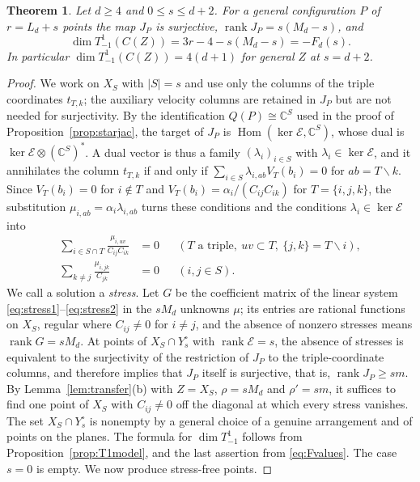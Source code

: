 \documentclass{amsart}
\newtheorem{theorem}{Theorem}[section]
\theoremstyle{definition}
\theoremstyle{remark}
\numberwithin{equation}{section}
\newcommand{\CC}{\mathbb{C}}
\DeclareMathOperator{\rank}{rank}
\DeclareMathOperator{\Hom}{Hom}
\begin{document}
\begin{theorem}\label{thm:outer}
Let $d\ge4$ and $0\le s\le d+2$. For a general configuration $P$ of $r=L_d+s$ points
the map $J_P$ is surjective, $\rank J_P=s(M_d-s)$, and
\[
  \dim T^1_{-1}(C(Z))=3r-4-s(M_d-s)=-F_d(s).
\]
In particular $\dim T^1_{-1}(C(Z))=4(d+1)$ for general $Z$ at $s=d+2$.
\end{theorem}

\begin{proof}
We work on $X_S$ with $|S|=s$ and use only the columns of the triple coordinates
$t_{T,k}$; the auxiliary velocity columns are retained in $J_P$ but are not needed
for surjectivity. By the identification $Q(P)\cong\CC^S$ used in the proof of
Proposition~\ref{prop:starjac}, the target of $J_P$ is $\Hom(\ker\mathcal E,\CC^S)$,
whose dual is $\ker\mathcal E\otimes(\CC^S)^*$. A dual vector is thus a family
$(\lambda_i)_{i\in S}$ with $\lambda_i\in\ker\mathcal E$, and it annihilates the column
$t_{T,k}$ if and only if $\sum_{i\in S}\lambda_{i,ab}V_T(b_i)=0$ for $ab=T\smallsetminus
k$. Since $V_T(b_i)=0$ for $i\notin T$ and $V_T(b_i)=\alpha_i/(C_{ij}C_{ik})$ for
$T=\{i,j,k\}$, the substitution $\mu_{i,ab}=\alpha_i\lambda_{i,ab}$ turns these
conditions and the conditions $\lambda_i\in\ker\mathcal E$ into
\begin{align}
  \sum_{i\in S\cap T}\frac{\mu_{i,uv}}{C_{ij}C_{ik}}&=0
    &&(T\text{ a triple},\ uv\subset T,\ \{j,k\}=T\smallsetminus i),\label{eq:stress1}\\
  \sum_{k\ne j}\frac{\mu_{i,jk}}{C_{jk}}&=0&&(i,j\in S).\label{eq:stress2}
\end{align}
We call a solution a \emph{stress}. Let $G$ be the coefficient matrix of the linear
system \eqref{eq:stress1}--\eqref{eq:stress2} in the $sM_d$ unknowns $\mu$; its entries
are rational functions on $X_S$, regular where $C_{ij}\ne0$ for $i\ne j$, and the absence
of nonzero stresses means $\rank G=sM_d$. At points of $X_S\cap Y_s^\circ$ with
$\rank\mathcal E=s$, the absence of stresses is equivalent to the surjectivity of the
restriction of $J_P$ to the triple-coordinate columns, and therefore implies that $J_P$
itself is surjective, that is, $\rank J_P\ge sm$. By Lemma~\ref{lem:transfer}(b) with
$Z=X_S$, $\rho=sM_d$ and $\rho'=sm$, it suffices to find one point of $X_S$ with
$C_{ij}\ne0$ off the diagonal at which every stress vanishes. The set $X_S\cap Y_s^\circ$ is nonempty
by a general choice of a genuine arrangement and of points on the planes. The formula
for $\dim T^1_{-1}$ follows from Proposition~\ref{prop:T1model}, and the last
assertion from \eqref{eq:Fvalues}. The case $s=0$ is empty. We now produce stress-free
points.


\end{proof}
\end{document}
